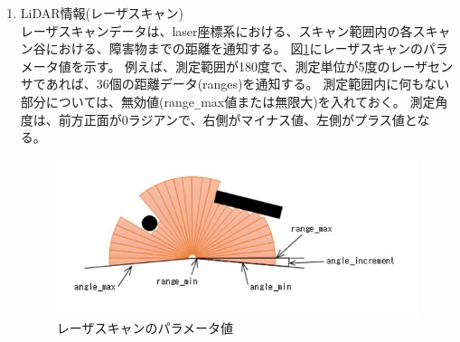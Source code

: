 \begin{enumerate}
  \item LiDAR情報(レーザスキャン)\\
  レーザスキャンデータは、laser座標系における、スキャン範囲内の各スキャン谷における、障害物までの距離を通知する。
  図\ref{auto:navstack:laser_scan}にレーザスキャンのパラメータ値を示す。  例えば、測定範囲が180度で、測定単位が5度のレーザセンサであれば、36個の距離データ(ranges)を通知する。
  測定範囲内に何もない部分については、無効値(range\verb|_|max値または無限大)を入れておく。
  測定角度は、前方正面が0ラジアンで、右側がマイナス値、左側がプラス値となる。
  \begin{figure}[h]
    \begin{center}
      \includegraphics[width=.8\linewidth]{img/auto_11.jpg}
      \caption{レーザスキャンのパラメータ値}
      \label{auto:navstack:laser_scan}
    \end{center}
  \end{figure}


\end{enumerate}
